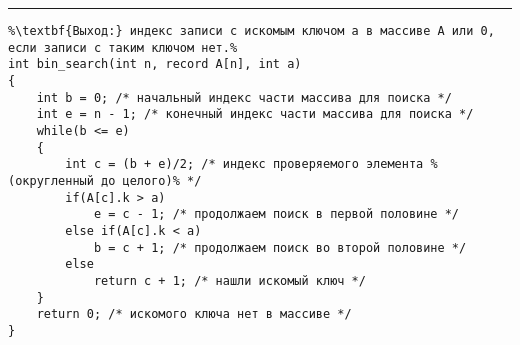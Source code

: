 \documentclass{article}
\begin{document}
\vspace{5pt} \hrule
\begin{lstlisting}[caption={Бинарный поиск}, label=p316_bin_search, escapechar=\%]
%\noindent\textbf{Вход:} упорядоченный массив A: \textbf{array} [1..n] \textbf{of record} k: key; i: info \textbf{end record}; ключ a: key.\\%
%\textbf{Выход:} индекс записи с искомым ключом a в массиве A или 0, если записи с таким ключом нет.%
int bin_search(int n, record A[n], int a)
{
	int b = 0; /* начальный индекс части массива для поиска */
	int e = n - 1; /* конечный индекс части массива для поиска */
	while(b <= e)
	{
		int c = (b + e)/2; /* индекс проверяемого элемента %(округленный до целого)% */
		if(A[c].k > a)
			e = c - 1; /* продолжаем поиск в первой половине */
		else if(A[c].k < a)
			b = c + 1; /* продолжаем поиск во второй половине */
		else
			return c + 1; /* нашли искомый ключ */
	}
	return 0; /* искомого ключа нет в массиве */
}
\end{lstlisting}
\end{document}
